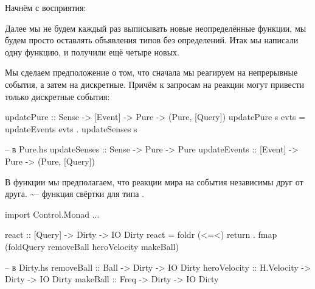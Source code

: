 Начнём с восприятия:



Далее мы не будем каждый раз выписывать новые неопределённые функции, мы
будем просто оставлять объявления типов без определений. Итак мы
написали одну функцию, и получили ещё четыре новых.

Мы сделаем предположение о том, что сначала мы реагируем на непрерывные
события, а затем на дискретные. Причём к запросам на реакции могут
привести только дискретные события:


\begin{code}
updatePure :: Sense -> [Event] -> Pure -> (Pure, [Query])
updatePure s evts = updateEvents evts . updateSenses s 

-- в Pure.hs
updateSenses :: Sense -> Pure -> Pure
updateEvents :: [Event] -> Pure -> (Pure, [Query])
\end{code}

В функции  мы предполагаем, что реакции мира на события
независимы друг от друга. \textasciitilde{}-- функция
свёртки для типа .


\begin{code}
import Control.Monad
...

react :: [Query] -> Dirty -> IO Dirty
react = foldr (<=<) return   
    . fmap (foldQuery removeBall heroVelocity makeBall)

-- в Dirty.hs
removeBall      :: Ball         -> Dirty -> IO Dirty
heroVelocity    :: H.Velocity   -> Dirty -> IO Dirty
makeBall        :: Freq         -> Dirty -> IO Dirty
\end{code}

